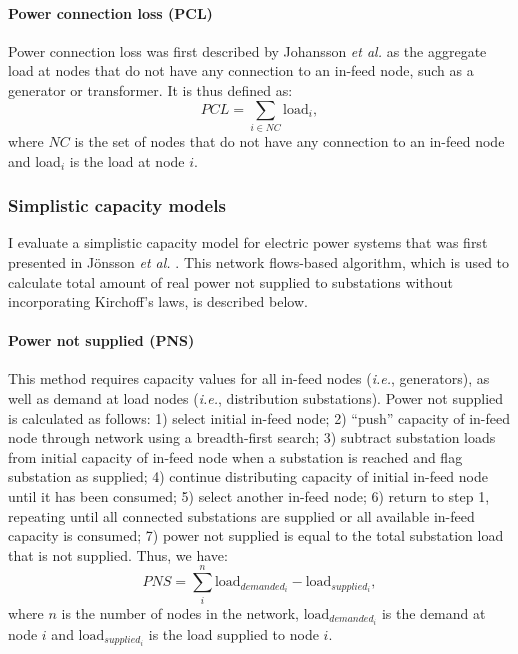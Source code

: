 \paragraph{\normalfont\textbf{Power connection loss (PCL)}}
Power connection loss was first described by Johansson \emph{et al.} \cite{Johansson2007a} as the aggregate load at nodes that do not have any connection to an in-feed node, such as a generator or transformer. It is thus defined as:
\begin{equation}
 PCL = \sum_{i \in NC} \textrm{load}_i, 
\end{equation}
where $NC$ is the set of nodes that do not have any connection to an in-feed node and load$_i$ is the load at node $i$.


\subsubsection{Simplistic capacity models}
\label{ssec:methods:models:capacity}

I evaluate a simplistic capacity model for electric power systems that was first presented in J\"{o}nsson \emph{et al.} \cite{Jonsson2008}. This network flows-based algorithm, which is used to calculate total amount of real power not supplied to substations without incorporating Kirchoff's laws, is described below.

\paragraph{\normalfont\textbf{Power not supplied (PNS)}}
This method requires capacity values for all in-feed nodes (\emph{i.e.}, generators), as well as demand at load nodes (\emph{i.e.}, distribution substations). Power not supplied is calculated as follows: 1) select initial in-feed node; 2) “push” capacity of in-feed node through network using a breadth-first search; 3) subtract substation loads from initial capacity of in-feed node when a substation is reached and flag substation as supplied; 4) continue distributing capacity of initial in-feed node until it has been consumed; 5) select another in-feed node; 6) return to step 1, repeating until all connected substations are supplied or all available in-feed capacity is consumed; 7) power not supplied is equal to the total substation load that is not supplied.  Thus, we have:
\begin{equation}
 PNS = \sum_i^n \textrm{load}_{demanded_i} - \textrm{load}_{supplied_i},
\end{equation}
where $n$ is the number of nodes in the network, $\textrm{load}_{demanded_i}$ is the demand at node $i$ and $\textrm{load}_{supplied_i}$ is the load supplied to node $i$.

